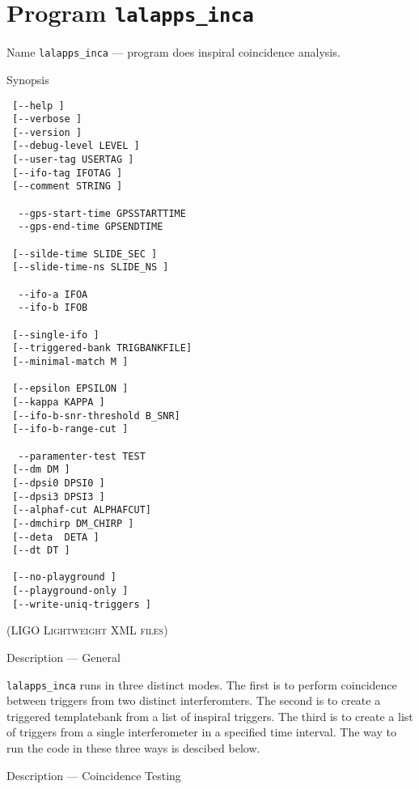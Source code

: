 \section{Program \texttt{lalapps\_inca}}
\label{program:lalapps-inca}

\begin{entry}
\item[Name]
\verb$lalapps_inca$ --- program does inspiral coincidence analysis.

\item[Synopsis]
\begin{verbatim}
 [--help ] 
 [--verbose ]
 [--version ] 
 [--debug-level LEVEL ]
 [--user-tag USERTAG ]
 [--ifo-tag IFOTAG ]
 [--comment STRING ] 
 
  --gps-start-time GPSSTARTTIME      
  --gps-end-time GPSENDTIME       
 
 [--silde-time SLIDE_SEC ]
 [--slide-time-ns SLIDE_NS ] 
 
  --ifo-a IFOA              
  --ifo-b IFOB             
 
 [--single-ifo ]
 [--triggered-bank TRIGBANKFILE]
 [--minimal-match M ]
 
 [--epsilon EPSILON ]
 [--kappa KAPPA ]
 [--ifo-b-snr-threshold B_SNR]
 [--ifo-b-range-cut ]
 
  --paramenter-test TEST   
 [--dm DM ]  
 [--dpsi0 DPSI0 ]
 [--dpsi3 DPSI3 ]
 [--alphaf-cut ALPHAFCUT]
 [--dmchirp DM_CHIRP ]
 [--deta  DETA ]
 [--dt DT ]
 
 [--no-playground ]
 [--playground-only ]
 [--write-uniq-triggers ]

\end{verbatim}

\textsc{(LIGO Lightweight XML files)}

\item[Description --- General] 

\verb$lalapps_inca$ runs in three distinct modes.  The first is to
perform coincidence between triggers from two distinct interferomters.
The second is to create a triggered templatebank from a list of inspiral
triggers.  The third is to create a list of triggers from a single
interferometer in a specified time interval.  The way to run the code in
these three ways is descibed below.


\item[Description --- Coincidence Testing]


\end{entry}

